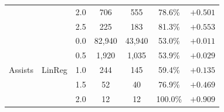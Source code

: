 \documentclass[12pt, letterpaper]{article}
\begin{document}
\begin{table}[H]
\begin{tabular}{llccccc}
  & & 2.0 &    706 &    555 & 78.6\% & $+0.501$ \\
  & & 2.5 &    225 &    183 & 81.3\% & $+0.553$ \\
\midrule
\multirow{5}{*}{Assists}
  & \multirow{5}{*}{LinReg}
    & 0.0 & 82,940 & 43,940 & 53.0\% & $+0.011$ \\
  & & 0.5 &  1,920 &  1,035 & 53.9\% & $+0.029$ \\
  & & 1.0 &    244 &    145 & 59.4\% & $+0.135$ \\
  & & 1.5 &     52 &     40 & 76.9\% & $+0.469$ \\
  & & 2.0 &     12 &     12 & 100.0\% & $+0.909$ \\
\bottomrule
\end{tabular}
\end{table}
\end{document}
